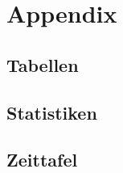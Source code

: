 \documentclass[12pt,a4paper,bibliography=totocnumbered,listof=totocnumbered]{scrartcl}
\begin{document}








\section{Appendix}



\subsection{Tabellen}

\subsection{Statistiken}

\subsection{Zeittafel}
\end{document}
